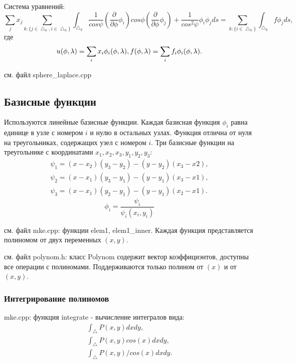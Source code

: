 \documentclass[a4paper,article]{article}
\begin{document}
Система уравнений:
\begin{equation*}
\sum_j x_j \sum_{k: \{j\in\bigtriangleup_k, i\in\bigtriangleup_k\}}\int_{\bigtriangleup_k}\frac{1}{cos\psi}(\frac{\partial}{\partial \phi} \phi_i) cos\phi (\frac{\partial}{\partial \phi} \phi_j)+\frac{1}{cos^2\psi}\phi_i\phi_j ds = \sum_{k:\{i\in\bigtriangleup_k\}}\int_{\bigtriangleup_k}f \phi_j ds,
\end{equation*}
где
\begin{equation*}
u(\phi,\lambda)=\sum_i x_i \phi_i(\phi, \lambda),\\
f(\phi,\lambda)=\sum_i f_i \phi_i(\phi, \lambda).
\end{equation*}

см. файл sphere\_laplace.cpp

\subsection{Базисные  функции}
Используются линейные базисные функции. Каждая базисная функция $\phi_i$ равна единице в узле с номером $i$ и нулю в остальных узлах. Функция отлична от нуля на треугольниках, содержащих узел с номером $i$.
Три базисные функции на треугольнике с координатами $x_1,x_2,x_3, y_1,y_2,y_3$:
\begin{equation*}
\begin{split}
\psi_1=(x-x_2)(y_3-y_2)-(y-y_2)(x_3-x2),\\
\psi_2=(x-x_1)(y_3-y_1)-(y-y_1)(x_3-x1),\\
\psi_3=(x-x_1)(y_2-y_1)-(y-y_1)(x_2-x1).
\end{split}
\end{equation*} 
\begin{equation*}
\phi_i=\frac{\psi_i}{\psi_i(x_i,y_i)}
\end{equation*}

см. файл mke.cpp: функции elem1, elem1\_inner.
Каждая функция представляется полиномом от двух переменных $(x,y)$.

см. файл polynom.h: класс Polynom содержит вектор коэффициэнтов, доступны все операции с полиномами. Поддерживаются только полином от $(x)$ и от $(x,y)$.

\subsubsection{Интегрирование  полиномов} 
mke.cpp: функция integrate - вычисление интегралов вида:
\begin{equation*}
\begin{split}
\int_\bigtriangleup P(x,y) dx dy,\\
\int_\bigtriangleup P(x,y) cos(x) dx dy,\\
\int_\bigtriangleup P(x,y) / cos(x) dx dy.
\end{split}
\end{equation*}
\end{document}
